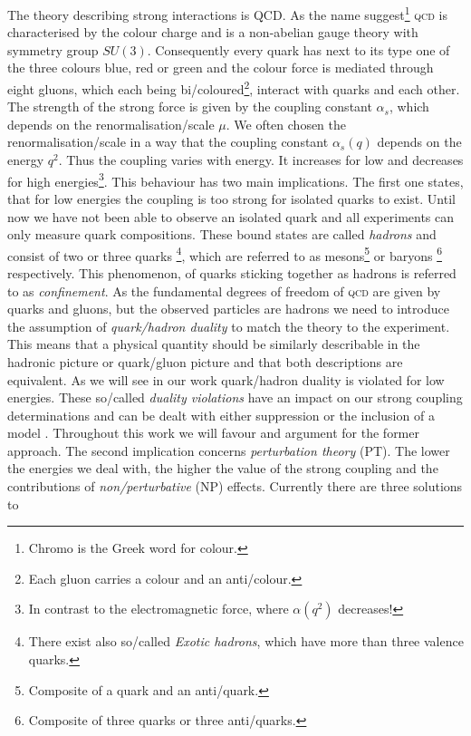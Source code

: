 \documentclass[../../index.tex]{subfiles}
\begin{document}
The theory describing strong interactions is \textsc{QCD}. As the name
suggest\footnote{Chromo is the Greek word for colour.} \textsc{qcd} is
characterised by the colour charge and is a non-abelian gauge theory with
symmetry group $SU(3)$. Consequently every quark has next to its type one of the
three colours blue, red or green and the colour force is mediated through eight
gluons, which each being bi\-/coloured\footnote{Each gluon carries a colour and
  an anti\-/colour.}, interact with quarks and each other. The strength of the
strong force is given by the coupling constant $\alpha_s$, which depends on the
renormalisation\-/scale $\mu$. We often chosen the renormalisation\-/scale in a
way that the coupling constant $\alpha_s(q)$ depends on the energy $q^2$. Thus
the coupling varies with energy. It increases for low and decreases for high
energies\footnote{In contrast to the electromagnetic force, where $\alpha(q^2)$
  decreases!}. This behaviour has two main implications. The first one states,
that for low energies the coupling is too strong for isolated quarks to exist.
Until now we have not been able to observe an isolated quark and all experiments
can only measure quark compositions. These bound states are called
\textit{hadrons} and consist of two or three quarks \footnote{There exist also
  so\-/called \textit{Exotic hadrons}, which have more than three valence
  quarks.}, which are referred to as mesons\footnote{Composite of a quark and an
  anti\-/quark.} or baryons \footnote{Composite of three quarks or three
  anti\-/quarks.} respectively. This phenomenon, of quarks sticking together as
hadrons is referred to as \textit{confinement}. As the fundamental degrees of
freedom of \textsc{qcd} are given by quarks and gluons, but the observed
particles are hadrons we need to introduce the assumption of
\textit{quark\-/hadron duality} to match the theory to the experiment. This
means that a physical quantity should be similarly describable in the hadronic
picture or quark\-/gluon picture and that both descriptions are equivalent. As
we will see in our work quark\-/hadron duality is violated for low energies.
These so\-/called \textit{duality violations} have an impact on our strong
coupling determinations and can be dealt with either suppression or the
inclusion of a model \cite{Pich2006,Cata2008}. Throughout this work we will
favour and argument for the former approach. The second implication concerns
\textit{perturbation theory} (PT). The lower the energies we deal with, the
higher the value of the strong coupling and the contributions of
\textit{non\-/perturbative} (NP) effects. Currently there are three solutions to
\end{document}
